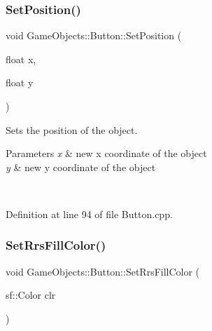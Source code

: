 \subsubsection{\texorpdfstring{SetPosition()}{SetPosition()}\hspace{0.1cm}{\footnotesize\ttfamily [2/2]}}
{\footnotesize\ttfamily void Game\+Objects\+::\+Button\+::\+Set\+Position (\begin{DoxyParamCaption}\item[{float}]{x,  }\item[{float}]{y }\end{DoxyParamCaption})}



Sets the position of the object. 


\begin{DoxyParams}{Parameters}
{\em x} & new x coordinate of the object\\
\hline
{\em y} & new y coordinate of the object \begin{DoxyVerb}\end{DoxyVerb}
 \\
\hline
\end{DoxyParams}


Definition at line 94 of file Button.\+cpp.


\begin{DoxyCode}{0}

\end{DoxyCode}
\mbox{\label{class_game_objects_1_1_button_a2ec5d756fe1b74a36ff4878bc0b5d95a}} 
\subsubsection{\texorpdfstring{SetRrsFillColor()}{SetRrsFillColor()}}
{\footnotesize\ttfamily void Game\+Objects\+::\+Button\+::\+Set\+Rrs\+Fill\+Color (\begin{DoxyParamCaption}\item[{sf\+::\+Color}]{clr }\end{DoxyParamCaption})}




